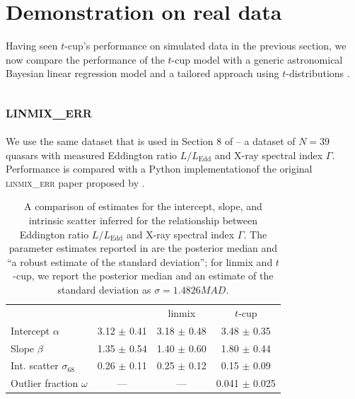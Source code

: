 \documentclass[fleqn,usenatbib]{mnras}
\begin{document}
\section{Demonstration on real data}
\label{sec:real-world}


Having seen $t$-cup's performance on simulated data in the previous section, we
now compare the performance of the $t$-cup model with a generic astronomical
Bayesian linear regression model \citep[\textsc{linmix\_err};][]{Kelly:2007} and
a tailored approach using $t$-distributions \citep{Park:2017}.

\subsection{\textsc{linmix\_err}}

We use the same dataset that is used in Section 8 of \citet{Kelly:2007} -- a
dataset of $N = 39$ quasars with measured Eddington ratio $L / L_{\text{Edd}}$
and X-ray spectral index $\Gamma$. Performance is compared with a Python
implementation\footnotemark of the original \textsc{linmix\_err} paper proposed
by \citeauthor{Kelly:2007}.


\begin{table}
	\centering
	\caption{A comparison of estimates for the intercept,
    slope, and intrinsic scatter inferred for the relationship between Eddington
    ratio $L / L_{\text{Edd}}$ and X-ray spectral index $\Gamma$. The parameter
    estimates reported in \citet{Kelly:2007} are the posterior median and ``a
    robust estimate of the standard deviation''; for linmix and $t$-cup, we
    report the posterior median and an estimate of the standard deviation as
    $\sigma = 1.4826 MAD$.}
	\label{tab:real-world.kelly.params}
	\begin{tabular}{lccc} %
                               & \citet{Kelly:2007} & linmix   & $t$-cup       \\
    Intercept $\alpha$         & 3.12 $\pm$ 0.41 & 3.18 $\pm$ 0.48 & 3.48 $\pm$ 0.35 \\
    Slope $\beta$              & 1.35 $\pm$ 0.54 & 1.40 $\pm$ 0.60 & 1.80 $\pm$ 0.44 \\
    Int. scatter $\sigma_{68}$ & 0.26 $\pm$ 0.11 & 0.25 $\pm$ 0.12 & 0.15 $\pm$ 0.09 \\
    Outlier fraction $\omega$  &      ---      &      ---      & 0.041 $\pm$ 0.025 \\
\end{tabular}
\end{table}
\end{document}
